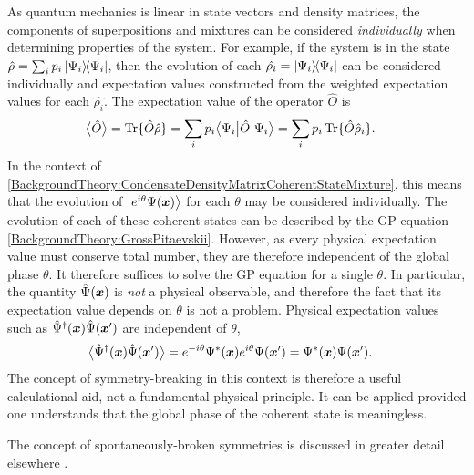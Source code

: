 As quantum mechanics is linear in state vectors and density matrices, the components of superpositions and mixtures can be considered \emph{individually} when determining properties of the system.  For example, if the system is in the state $\hat{\rho} = \sum_i p_i \left|\Psi_i\middle>\!\middle<\Psi_i\right|$, then the evolution of each $\hat{\rho_i} = \left|\Psi_i\middle>\!\middle<\Psi_i\right|$ can be considered individually and expectation values constructed from the weighted expectation values for each $\hat{\rho_i}$.  The expectation value of the operator $\hat{O}$ is
\begin{align*}
    {\ensuremath{\big<\hat{O}\big>}} &= \operatorname{Tr}\{ \hat{O} \hat{\rho}  \} = \sum_i p_i \big< \Psi_i \big| \hat{O} \big| \Psi_i \big> = \sum_i p_i \operatorname{Tr}\{ \hat{O} \hat{\rho}_i  \}.
\end{align*}
In the context of \eqref{BackgroundTheory:CondensateDensityMatrixCoherentStateMixture}, this means that the evolution of ${\left|e^{i \theta}\Psi(\bm{x})\right>}$ for each $\theta$ may be considered individually.  The evolution of each of these coherent states can be described by the GP equation \eqref{BackgroundTheory:GrossPitaevskii}.  However, as every physical expectation value must conserve total number, they are therefore independent of the global phase $\theta$.  It therefore suffices to solve the GP equation for a single $\theta$.  In particular, the quantity $\hat{\Psi}(\bm{x})$ is \emph{not} a physical observable, and therefore the fact that its expectation value depends on $\theta$ is not a problem.  Physical expectation values such as $\hat{\Psi}^\dagger(\bm{x}) \hat{\Psi}(\bm{x}')$ are independent of $\theta$,
\begin{align}
    {\ensuremath{\big<\hat{\Psi}^\dagger(\bm{x}) \hat{\Psi}(\bm{x}')\big>}} &= e^{-i\theta}\Psi^*(\bm{x}) e^{i\theta}\Psi(\bm{x}') = \Psi^*(\bm{x}) \Psi(\bm{x}').
\end{align}
The concept of symmetry-breaking in this context is therefore a useful calculational aid, not a fundamental physical principle.    It can be applied provided one understands that the global phase of the coherent state is meaningless.

The concept of spontaneously-broken symmetries is discussed in greater detail elsewhere \citep{Leggett:1991fj,Molmer:1997fr}.  %

